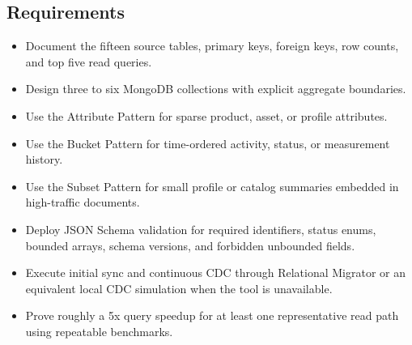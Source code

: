 \subsection*{Requirements}
\begin{itemize}
    \item Document the fifteen source tables, primary keys, foreign keys, row counts, and top five read queries.
    \item Design three to six MongoDB collections with explicit aggregate boundaries.
    \item Use the Attribute Pattern for sparse product, asset, or profile attributes.
    \item Use the Bucket Pattern for time-ordered activity, status, or measurement history.
    \item Use the Subset Pattern for small profile or catalog summaries embedded in high-traffic documents.
    \item Deploy JSON Schema validation for required identifiers, status enums, bounded arrays, schema versions, and forbidden unbounded fields.
    \item Execute initial sync and continuous CDC through Relational Migrator or an equivalent local CDC simulation when the tool is unavailable.
    \item Prove roughly a 5x query speedup for at least one representative read path using repeatable benchmarks.
\end{itemize}


